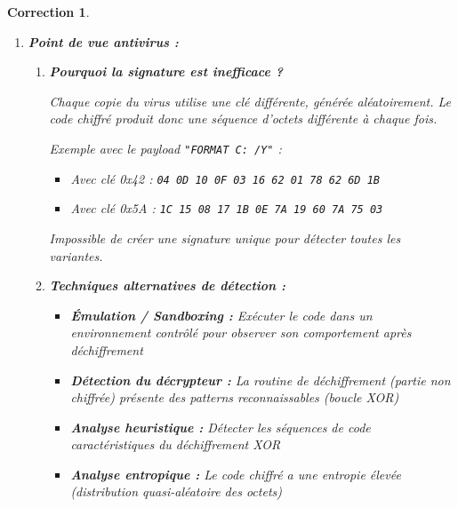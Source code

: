 \documentclass[a4paper,11pt]{article}
\theoremstyle{plain}
\newtheorem{correction}{Correction}
\theoremstyle{definition}
\begin{document}
\begin{correction}
\begin{enumerate}
L'opérateur modulo (\texttt{\%}) permet de ``boucler'' sur la clé : quand on atteint la fin de la clé, on recommence au début.

Exemple avec \texttt{"SECRET"} (6 caractères) sur \texttt{"FORMAT C: /Y"} (12 caractères) :
\begin{itemize}
\item Position 0 : 'F' $\oplus$ 'S'
\item Position 1 : 'O' $\oplus$ 'E'
\item \ldots
\item Position 6 : ' ' $\oplus$ 'S' (retour au début de la clé)
\end{itemize}

\item \textbf{Point de vue antivirus :}

\begin{enumerate}
\item \textbf{Pourquoi la signature est inefficace ?}

Chaque copie du virus utilise une clé différente, générée aléatoirement. Le code chiffré produit donc une séquence d'octets différente à chaque fois.

Exemple avec le payload \texttt{"FORMAT C: /Y"} :
\begin{itemize}
\item Avec clé 0x42 : \texttt{04 0D 10 0F 03 16 62 01 78 62 6D 1B}
\item Avec clé 0x5A : \texttt{1C 15 08 17 1B 0E 7A 19 60 7A 75 03}
\end{itemize}

Impossible de créer une signature unique pour détecter toutes les variantes.

\item \textbf{Techniques alternatives de détection :}

\begin{itemize}
\item \textbf{Émulation / Sandboxing :} Exécuter le code dans un environnement contrôlé pour observer son comportement après déchiffrement
\item \textbf{Détection du décrypteur :} La routine de déchiffrement (partie non chiffrée) présente des patterns reconnaissables (boucle XOR)
\item \textbf{Analyse heuristique :} Détecter les séquences de code caractéristiques du déchiffrement XOR
\item \textbf{Analyse entropique :} Le code chiffré a une entropie élevée (distribution quasi-aléatoire des octets)
\end{itemize}


\end{enumerate}
\end{enumerate}
\end{correction}
\end{document}
